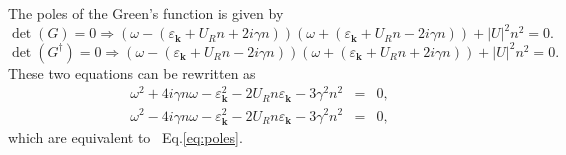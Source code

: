 \documentclass[aps,onecolumn,superscriptaddress,notitlepage,longbibliography]{revtex4-1}
\newcommand{\tmmathbf}[1]{\ensuremath{\boldsymbol{#1}}}
\begin{document}
The poles of the Green's function is given by
\begin{equation}
  \det (G) = 0 \Rightarrow (\omega - (\varepsilon_{\tmmathbf{k}} + U_R n + 2 i
  \gamma n)) (\omega + (\varepsilon_{\tmmathbf{k}} + U_R n - 2 i \gamma n)) +
  | U |^2 n^2 = 0.
\end{equation}
\begin{equation}
  \det (G^{\dagger}) = 0 \Rightarrow (\omega - (\varepsilon_{\tmmathbf{k}} +
  U_R n - 2 i \gamma n)) (\omega + (\varepsilon_{\tmmathbf{k}} + U_R n + 2 i
  \gamma n)) + | U |^2 n^2 = 0.
\end{equation}
These two equations can be rewritten as
\begin{eqnarray}
  \omega^2 + 4 i \gamma n \omega - \varepsilon_{\tmmathbf{k}}^2 - 2 U_R n
  \varepsilon_{\tmmathbf{k}} - 3 \gamma^2 n^2 & = & 0, \\
  \omega^2 - 4 i \gamma n \omega - \varepsilon_{\tmmathbf{k}}^2 - 2 U_R n
  \varepsilon_{\tmmathbf{k}} - 3 \gamma^2 n^2 & = & 0, 
\end{eqnarray}
which are equivalent to \ Eq.\ref{eq:poles}.
\end{document}
